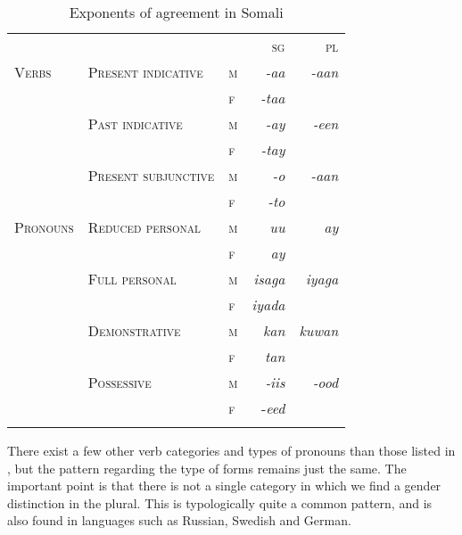 \documentclass[output=paper]{langsci/langscibook}
\begin{document}
\begin{table}
\caption{Exponents of agreement in Somali}
\label{tab:5}

\begin{tabularx}{\textwidth}{lp{4cm}Xrr} &  &  & \parbox{2cm}{\centering \textsc{sg}} & \parbox{2cm}{\centering \textsc{pl}}\\
\lsptoprule
{\textsc{Verbs}} & {\textsc{Present indicative}} & {\textsc{m}} & {\textit{-aa}} & {\textit{-aan}}\\
\hhline{~~~~-} &  & {\textsc{f}} & {\textit{-taa}} & \\
\hhline{~----} & {\textsc{Past indicative}} & {\textsc{m}} & {\textit{-ay}} & {\textit{-een}}\\
\hhline{~~~~-} &  & {\textsc{f}} & {\textit{-tay}} & \\
\hhline{~----} & {\textsc{Present subjunctive}} & {\textsc{m}} & {\textit{-o}} & {\textit{-aan}}\\
\hhline{~~~~-} &  & {\textsc{f}} & {\textit{-to}} & \\
{\textsc{Pronouns}} & {\textsc{Reduced personal}} & {\textsc{m}} & {\textit{uu}} & {\textit{ay}}\\
\hhline{~~~~-} &  & {\textsc{f}} & {\textit{ay}} & \\
\hhline{~----} & {\textsc{Full personal}} & {\textsc{m}} & {\textit{isaga}} & {\textit{iyaga}}\\
\hhline{~~~~-} &  & {\textsc{f}} & {\textit{iyada}} & \\
\hhline{~----} & {\textsc{Demonstrative}} & {\textsc{m}} & {\textit{kan}} & {\textit{kuwan}}\\
\hhline{~~~~-} &  & {\textsc{f}} & {\textit{tan}} & \\
\hhline{~----} & {\textsc{Possessive}} & {\textsc{m}} & {\textit{-iis}} & {\textit{-ood}}\\
\hhline{~~~~-} &  & {\textsc{f}} & {-\textit{eed}} & \\
\hhline{----~}
\lspbottomrule
\end{tabularx}

\end{table} 

There exist a few other verb categories and types of pronouns than those listed in , but the pattern regarding the type of forms remains just the same. The important point is that there is not a single category in which we find a gender distinction in the plural. This is typologically quite a common pattern, and is also found in languages such as Russian, Swedish and German.
\end{document}
